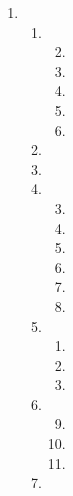 \documentclass[12pt,letterpaper]{article}
\begin{document}
\begin{enumerate}
\begin{enumerate}
\begin{enumerate}
              Since the truth value of final column is all false,
              this is a contradiction.
          \end{enumerate}
      \end{enumerate}
    \item
      \begin{enumerate}
        \item
          \begin{enumerate}
            \setcounter{enumiii}{1}
            \item
            \setcounter{enumiii}{3}
            \item
            \item
            \setcounter{enumiii}{8}
            \item
            \setcounter{enumiii}{11}
            \item
          \end{enumerate}
        \setcounter{enumii}{4}
        \item
        \item
        \setcounter{enumii}{7}
        \item
          \begin{enumerate}
            \setcounter{enumiii}{2}
            \item
            \item
            \item
            \item
            \setcounter{enumiii}{10}
            \item
            \item
          \end{enumerate}
        \item
          \begin{enumerate}
            \item
            \setcounter{enumiii}{2}
            \item
            \setcounter{enumiii}{6}
            \item
          \end{enumerate}
        \item
          \begin{enumerate}
            \setcounter{enumiii}{8}
            \item
            \item
            \item
          \end{enumerate}
        \item

\end{enumerate}
\end{enumerate}
\end{document}

